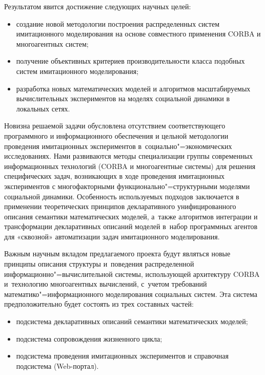 \documentclass[twoside]{article}
\begin{document}
Результатом явится достижение следующих научных целей:
\begin{itemize}
\item
    создание новой методологии построения распределенных
    систем имитационного моделирования на основе совместного применения
    CORBA и многоагентных систем;
\item
    получение объективных критериев производительности
    класса подобных систем имитационного моделирования;
\item
    разработка новых математических моделей и алгоритмов
    масштабируемых вычислительных экспериментов
    на моделях социальной динамики в локальных сетях.
\end{itemize}

Новизна решаемой задачи обусловлена
отсутствием соответствующего программного и информационного обеспечения
и цельной методологии проведения имитационных экспериментов
в~социально"=экономических исследованиях.
Нами развиваются методы специализации группы современных информационных технологий
(CORBA и многоагентные системы) для решения специфических задач,
возникающих в ходе проведения имитационных экспериментов
с многофакторными функционально"=структурными моделями социальной динамики.
Особенность используемых подходов заключается в применении теоретических принципов
декларативного унифицированного описания семантики математических моделей,
а~также алгоритмов интеграции и трансформации декларативных
описаний моделей в~набор программных агентов
для «сквозной» автоматизации задач имитационного моделирования.

Важным научным вкладом предлагаемого проекта
будут являться новые принципы описания структуры и~поведения
распределенной информационно"=вычислительной системы,
использующей архитектуру CORBA и~технологию многоагентных вычислений,
с~учетом требований математико"=информационного моделирования социальных систем.
Эта система предположительно будет состоять из трех составных частей:
\begin{itemize}
\item
    подсистема декларативных описаний семантики математических моделей;
\item
    подсистема сопровождения жизненного цикла;
\item
    подсистема проведения имитационных экспериментов и справочная подсистема (Web-портал).
\end{itemize}
\end{document}
